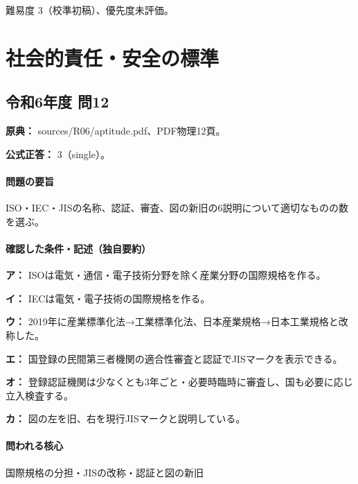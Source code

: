 \par 難易度 3（校準初稿）、優先度未評価。

\section{社会的責任・安全の標準}

\subsection{令和6年度 問12}
\label{q:r06-reg-apt-12}

\noindent\textbf{原典：} sources/R06/aptitude.pdf、PDF物理12頁。

\textbf{公式正答：} 3（single）。

\paragraph{問題の要旨} ISO・IEC・JISの名称、認証、審査、図の新旧の6説明について適切なものの数を選ぶ。

\paragraph{確認した条件・記述（独自要約）}\mbox{}\par

\noindent\textbf{ア：} ISOは電気・通信・電子技術分野を除く産業分野の国際規格を作る。\par

\noindent\textbf{イ：} IECは電気・電子技術の国際規格を作る。\par

\noindent\textbf{ウ：} 2019年に産業標準化法→工業標準化法、日本産業規格→日本工業規格と改称した。\par

\noindent\textbf{エ：} 国登録の民間第三者機関の適合性審査と認証でJISマークを表示できる。\par

\noindent\textbf{オ：} 登録認証機関は少なくとも3年ごと・必要時臨時に審査し、国も必要に応じ立入検査する。\par

\noindent\textbf{カ：} 図の左を旧、右を現行JISマークと説明している。\par

\paragraph{問われる核心} 国際規格の分担・JISの改称・認証と図の新旧

